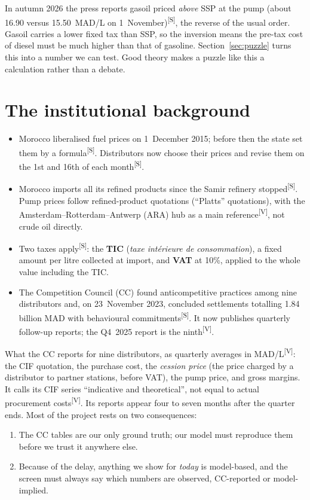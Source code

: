 \documentclass[11pt,a4paper]{article}
\newcommand{\tagV}{\textsuperscript{\textcolor{green!50!black}{\textsf{\scriptsize[V]}}}}
\newcommand{\tagS}{\textsuperscript{\textcolor{orange!80!black}{\textsf{\scriptsize[S]}}}}
\theoremstyle{definition}
\begin{document}
In autumn 2026 the press reports gasoil priced \emph{above} SSP at the pump (about 16.90 versus
15.50~MAD/L on 1~November)\tagS, the reverse of the usual order. Gasoil carries a lower fixed
tax than SSP, so the inversion means the pre-tax cost of diesel must be much higher than that of
gasoline. Section~\ref{sec:puzzle} turns this into a number we can test. Good theory makes a
puzzle like this a calculation rather than a debate.

\section{The institutional background}

\begin{itemize}
\item Morocco liberalised fuel prices on 1~December 2015; before then the state set them by a
  formula\tagS. Distributors now choose their prices and revise them on the 1st and 16th of
  each month\tagS.
\item Morocco imports all its refined products since the Samir refinery stopped\tagS. Pump prices
  follow refined-product quotations (``Platts'' quotations), with the Amsterdam--Rotterdam--Antwerp
  (ARA) hub as a main reference\tagV, not crude oil directly.
\item Two taxes apply\tagS: the \textbf{TIC} (\emph{taxe int\'erieure de consommation}), a fixed
  amount per litre collected at import, and \textbf{VAT} at 10\%, applied to the whole value
  including the TIC.
\item The Competition Council (CC) found anticompetitive practices among nine distributors and,
  on 23~November 2023, concluded settlements totalling 1.84 billion MAD with behavioural
  commitments\tagS. It now publishes quarterly follow-up reports; the Q4~2025 report is the
  ninth\tagV.
\end{itemize}

What the CC reports for nine distributors, as quarterly averages in MAD/L\tagV: the CIF
quotation, the purchase cost, the \emph{cession price} (the price charged by a distributor to
partner stations, before VAT), the pump price, and gross margins. It calls its CIF series
``indicative and theoretical'', not equal to actual procurement costs\tagV. Its reports appear
four to seven months after the quarter ends. Most of the project rests on two consequences:

\begin{keyidea}
\begin{enumerate}[leftmargin=1.5em]
\item The CC tables are our only ground truth; our model must reproduce them before we trust
  it anywhere else.
\item Because of the delay, anything we show for \emph{today} is model-based, and the screen must
  always say which numbers are observed, CC-reported or model-implied.
\end{enumerate}
\end{keyidea}
\end{document}
